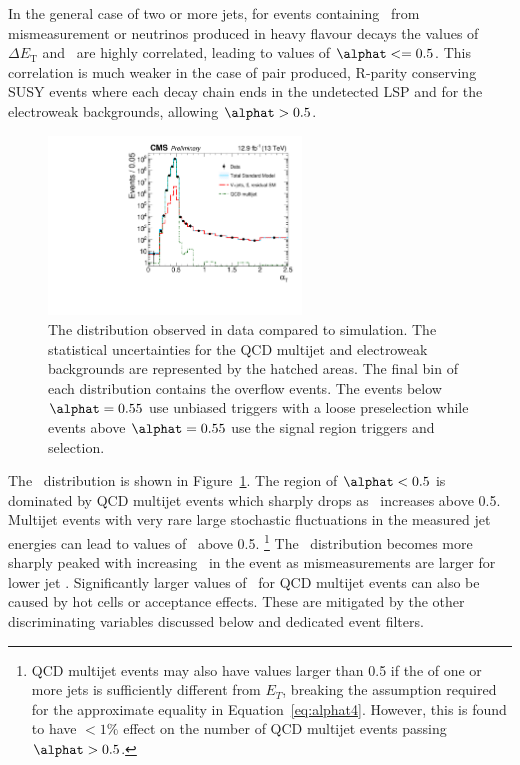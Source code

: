 In the general case of two or more jets, for events containing \met~from mismeasurement or 
neutrinos produced in heavy flavour decays the values of $\Delta E_{\textrm{T}}$ and \mht~are highly correlated, leading
to values of $\alphat <= 0.5$. This correlation is much weaker in the case of pair produced, 
R-parity conserving SUSY events where each decay chain ends in the 
undetected LSP and for the electroweak backgrounds, allowing $\alphat > 0.5$.

\begin{figure}[!htb]
  \centering
    \includegraphics[width=0.6\textwidth]{./Figures/alphat/alphat_data.pdf}
  \caption{
    The \alphat distribution observed in data compared to simulation. 
    The statistical uncertainties for the QCD multijet and electroweak backgrounds are represented by the hatched areas. 
    The final bin of each distribution contains the overflow events. The events below $\alphat= 0.55$ use unbiased triggers with
    a loose preselection while events above $\alphat = 0.55$ use the signal region triggers and selection.
    }
  \label{fig:alphat-data}
\end{figure}

The \alphat~distribution is shown in Figure~\ref{fig:alphat-data}. The region of $\alphat < 0.5$ is dominated by
QCD multijet events which sharply drops as \alphat~increases above 0.5. Multijet events with
very rare large stochastic fluctuations in the measured jet energies can lead
to values of \alphat~above 0.5. \footnote{QCD multijet events may also have \alphat values larger than 0.5 if the 
\pt of one or more jets is sufficiently different from $E_T$, breaking the assumption required for the approximate equality in 
Equation~\ref{eq:alphat4}. However, this is found to have $< 1\%$ effect on the number of QCD multijet events passing $\alphat > 0.5$.}
The \alphat~distribution becomes more sharply peaked with increasing \scalht~in the event as mismeasurements are larger
 for lower jet \pt. Significantly larger values of \alphat~for QCD multijet events can also be caused by 
hot cells or acceptance effects. These are mitigated by the other discriminating variables 
discussed below and dedicated event filters. 

